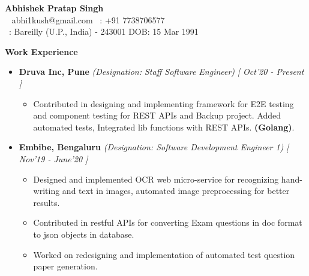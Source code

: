 \documentclass[a4paper,10pt]{article}
\newcommand{\resheading}[1]{{\small \colorbox{mygrey}{\begin{minipage}{0.988\textwidth}{\textbf{ \vphantom{p\^{E}} \large #1}}\end{minipage}}}}
\begin{document}
\textbf{\large{Abhishek Pratap Singh}}\\
\vspace{.1cm}
\indent \Letter ~ abhi1kush@gmail.com \kern 6pc \hfill \phone ~: +91 7738706577 \\
\faHome ~: \indent Bareilly (U.P., India) - 243001 \hfill DOB:
15 Mar 1991

\vspace{0.1cm}
\smallskip
\resheading{Work Experience}
\vspace{-0.4cm}
\begin{itemize}
\item \textbf{Druva Inc, Pune} 
\emph{(Designation: Staff Software Engineer)} \hfill {\emph{[ Oct'20 - Present ]}} \\[-0.6cm]
\begin{itemize}
\item Contributed in designing and implementing framework for E2E testing and component testing for REST APIs and Backup project. Added automated tests, Integrated lib functions with REST APIs. {\bf(Golang)}.
\end{itemize}
\item \textbf{Embibe, Bengaluru} 
\emph{(Designation: Software Development Engineer 1)} \hfill {\emph{[ Nov'19 - June'20 ]}} \\[-0.6cm]
\begin{itemize}
\item Designed and implemented OCR web micro-service for recognizing hand-writing and text in images, automated image preprocessing for better results.
\item Contributed in restful APIs for converting Exam questions in doc format to json objects in database.
\item Worked on redesigning and implementation of automated test question paper generation.  
\end{itemize}
\end{itemize}
\end{document}
